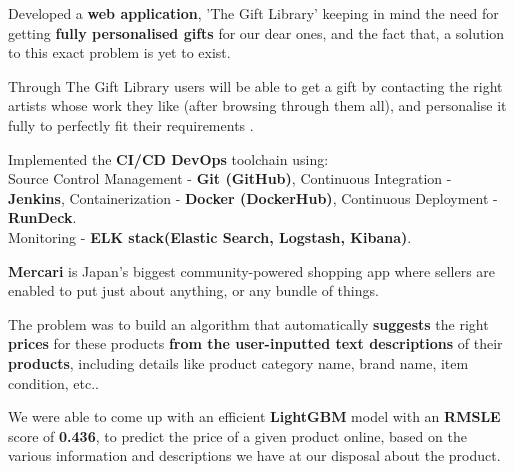 \documentclass[]{essdee-resume}
\begin{document}
\begin{minipage}[t]{0.66\textwidth}
\begin{tightemize}
\item Developed a \textbf{web application}, 'The Gift Library' keeping in mind the need for getting  \textbf{fully personalised gifts} for our dear ones, and the fact that, a solution to this exact problem is yet to exist.
\item Through The Gift Library users will be able to get a gift by contacting the right artists whose work they like (after browsing through them all), and personalise it fully to perfectly fit their requirements .
\item Implemented the \textbf{CI/CD DevOps} toolchain using: \\
Source Control Management - \textbf{Git (GitHub)}, 
Continuous Integration - \textbf{Jenkins}, 
Containerization - \textbf{Docker (DockerHub)},
Continuous Deployment - \textbf{RunDeck}.\\
Monitoring - \textbf{ELK stack(Elastic Search, Logstash, Kibana)}.
\end{tightemize}
\sectionsep

\begin{tightemize}
\item \textbf{Mercari} is Japan’s biggest community-powered shopping app where sellers are enabled to put just about anything, or any bundle of things.
\item The problem was to build an algorithm that automatically \textbf{suggests} the right \textbf{prices} for these products \textbf{from the user-inputted text descriptions} of their \textbf{products}, including details like product category name, brand name, item condition, etc..
\item We  were  able  to  come up  with  an  efficient \textbf{LightGBM} model  with an  \textbf{RMSLE} score of \textbf{0.436}, to predict the price of a given product online, based on the various information and descriptions we have at our disposal about the product.
\end{tightemize}
\sectionsep








\end{minipage}
\end{document}
